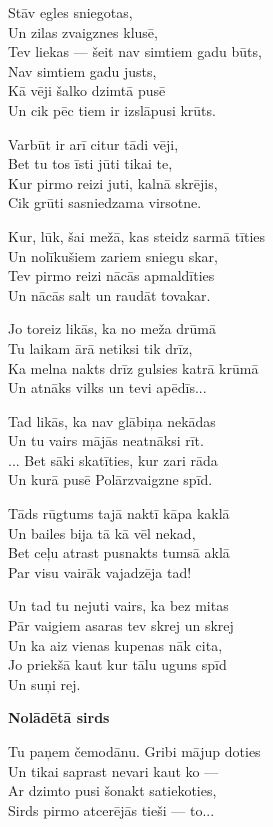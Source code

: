 \documentclass[14pt]{extarticle}
\begin{document}
{{Stāv egles sniegotas,\\
Un zilas zvaigznes klusē,\\
Tev liekas --- šeit nav simtiem gadu būts,\\
Nav simtiem gadu justs,\\
Kā vēji šalko dzimtā pusē\\
Un cik pēc tiem ir izslāpusi krūts.

Varbūt ir arī citur tādi vēji,\\
Bet tu tos īsti jūti tikai te,\\
Kur pirmo reizi juti, kalnā skrējis,\\
Cik grūti sasniedzama virsotne.

Kur, lūk, šai mežā, kas steidz sarmā tīties\\
Un nolīkušiem zariem sniegu skar,\\
Tev pirmo reizi nācās apmaldīties\\
Un nācās salt un raudāt tovakar.

Jo toreiz likās, ka no meža drūmā\\
Tu laikam ārā netiksi tik drīz,\\
Ka melna nakts drīz gulsies katrā krūmā\\
Un atnāks vilks un tevi apēdīs...

Tad likās, ka nav glābiņa nekādas\\
Un tu vairs mājās neatnāksi rīt.\\
... Bet sāki skatīties, kur zari rāda\\
Un kurā pusē Polārzvaigzne spīd.

Tāds rūgtums tajā naktī kāpa kaklā\\
Un bailes bija tā kā vēl nekad,\\
Bet ceļu atrast pusnakts tumsā aklā\\
Par visu vairāk vajadzēja tad!

Un tad tu nejuti vairs, ka bez mitas\\
Pār vaigiem asaras tev skrej un skrej\\
Un ka aiz vienas kupenas nāk cita,\\
Jo priekšā kaut kur tālu uguns spīd\\
Un suņi rej. 


\newpage


{\bf Nolādētā sirds}

Tu paņem čemodānu. Gribi mājup doties\\
Un tikai saprast nevari kaut ko ---\\
Ar dzimto pusi šonakt satiekoties,\\
Sirds pirmo atcerējās tieši --- to...

}}
\end{document}
